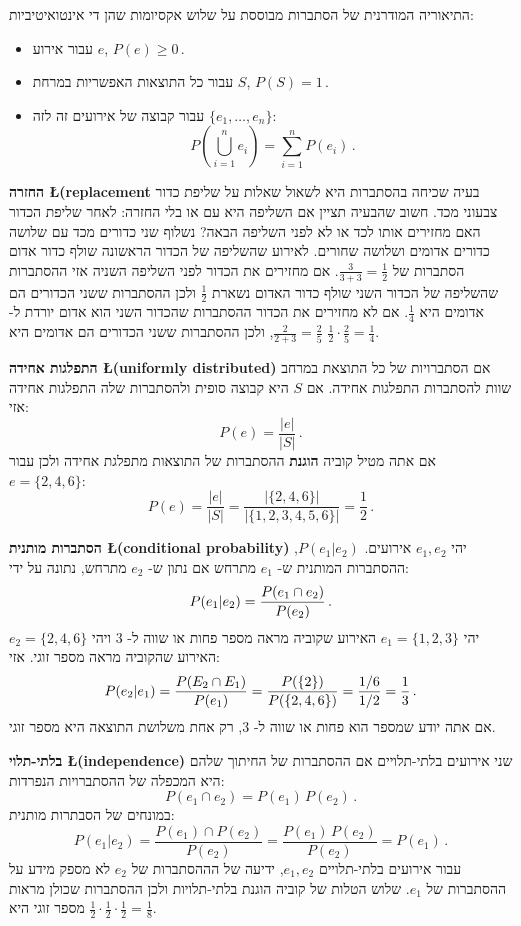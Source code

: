 התיאוריה המודרנית של הסתברות מבוססת על שלוש אקסיומות שהן די אינטואיטיביות:
\begin{itemize}
\item 
עבור אירוע
$e$, $P(e) \geq 0\,$.
\item 
עבור כל התוצאות האפשריות במרחת 
$S$, $P(S) = 1\,$.
\item
עבור קבוצה של אירועים זה לזה
$\{e_1,\ldots,e_n\}$:
\[
P\left(\bigcup_{i=1}^{n} e_i\right)=\sum_{i=1}^{n} P(e_i)\,.
\]
\end{itemize}

\textbf{החזרה \L{\small (replacement}}
בעיה שכיחה בהסתברות היא לשאול שאלות על שליפת כדור צבעוני מכד. חשוב שהבעיה תציין אם השליפה היא עם או בלי החזרה: לאחר שליפת הכדור האם מחזירים אותו לכד או לא לפני השליפה הבאה? נשלוף שני כדורים מכד עם שלושה כדורים אדומים ושלושה שחורים. לאירוע שהשליפה של הכדור הראשונה שולף כדור אדום הסתברות של
$\frac{3}{3+3}=\frac{1}{2}$.
אם מחזירים את הכדור לפני השליפה השניה אזי ההסתברות שהשליפה של הכדור השני שולף כדור האדום נשארת 
$\frac{1}{2}$
ולכן ההסתברות ששני הכדורים הם אדומים היא
$\frac{1}{4}$.
אם לא מחזירים את הכדור ההסתברות שהכדור השני הוא אדום יורדת ל-%
$\frac{2}{2+3}=\frac{2}{5}$,
ולכן ההסתברות ששני הכדורים הם אדומים היא
$\frac{1}{2}\cdot\frac{2}{5}=\frac{1}{4}$.

\textbf{התפלגות אחידה \L{\small (uniformly distributed)}} 
אם הסתברויות של כל התוצאת במרחב שוות להסתברות התפלגות אחידה. אם 
$S$
היא קבוצה סופית ולהסתברות שלה התפלגות אחידה אזי:
\[
P(e)=\frac{|e|}{|S|}\,.
\]
אם אתה מטיל קוביה
\textbf{הוגנת}
ההסתברות של התוצאות מתפלגת אחידה ולכן עבור
$e=\{2,4,6\}$:
\[
P(e) = \frac{|e|}{|S|} = \frac{|\{2,4,6\}|}{|\{1,2,3,4,5,6\}|}=\frac{1}{2}\,.
\]

\textbf{הסתברות מותנית \L{\small (conditional probability)}} 
יהי 
$e_1,e_2$
אירועים. 
$P(e_1 | e_2)$,
ההסתברות המותנית ש-%
$e_1$
מתרחש אם נתון ש-%
$e_2$
מתרחש, נתונה על ידי:
\[
P(e_1 | e_2) = \displaystyle\frac{P(e_1 \cap e_2)}{P(e_2)}\,.
\]
יהי 
$e_1=\{1,2,3\}$
האירוע שקוביה מראה מספר פחות או שווה ל-%
$3$
ויהי
$e_2=\{2,4,6\}$
האירוע שהקוביה מראה מספר זוגי. אזי:
\[
P(e_2 | e_1) = \displaystyle\frac{P(E_2 \cap E_1)}{P(e_1)}=\displaystyle\frac{P(\{2\})}{P(\{2,4,6\})}= \displaystyle\frac{1/6}{1/2}=\displaystyle\frac{1}{3}\,.
\]
אם אתה יודע שמספר הוא פחות או שווה ל-%
$3$,
רק אחת משלושת התוצאה היא מספר זוגי.

\textbf{בלתי-תלוי \L{\small (independence)}}
שני אירועים בלתי-תלויים אם ההסתברות של החיתוך שלהם היא המכפלה של ההסתברויות הנפרדות:
\[
P(e_1 \cap e_2)=P(e_1)\,P(e_2)\,.
\]
במונחים של הסבתרות מותנית:
\[
P(e_1 | e_2)=\frac{P(e_1)\cap P(e_2)}{P(e_2)} = \frac{P(e_1)\,P(e_2)}{P(e_2)}=P(e_1)\,. 
\]
עבור אירועים בלתי-תלויים
$e_1,e_2$,
ידיעה של הההסתברות של
$e_2$
לא מספק מידע על ההסתברות של
$e_1$.
שלוש הטלות של קוביה הוגנת בלתי-תלויות ולכן ההסתברות שכולן מראות מספר זוגי היא
$\frac{1}{2}\cdot \frac{1}{2}\cdot \frac{1}{2}=\frac{1}{8}$. 

